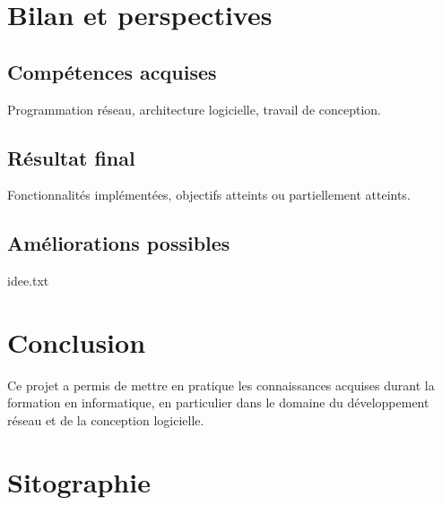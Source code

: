 \documentclass[a4paper, 11pt]{report}
\begin{document}


\chapter{Bilan et perspectives}

\section{Compétences acquises}

Programmation réseau, architecture logicielle,
travail de conception.

\section{Résultat final}

Fonctionnalités implémentées,
objectifs atteints ou partiellement atteints.

\section{Améliorations possibles}

idee.txt



\chapter*{Conclusion}

Ce projet a permis de mettre en pratique les connaissances acquises
durant la formation en informatique, en particulier dans le domaine
du développement réseau et de la conception logicielle.




\chapter*{Sitographie}
\end{document}
